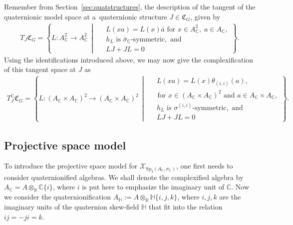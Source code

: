 \documentclass[oneside,11pt]{amsart}
\theoremstyle{definition}
\theoremstyle{remark}
\newcommand{\midwd}{\,\middle\vert\,}
\numberwithin{thm}{section}
\numberwithin{equation}{section}
\begin{document}
Remember from Section~\ref{sec:quatstructures}, the description of the tangent of the quaternionic model space at a~quaternionic structure $J\in\mathfrak{C}_G$,  given by 
\begin{align*}
T_J\mathfrak{C}_G=\left\{L\colon A_\mathbb{C}^2\to A_\mathbb{C}^2  \midwd
\begin{aligned} 
&\ L(xa)=L(x)\bar a \text{ for } x\in A_\mathbb{C}^2,\;a\in A_\mathbb{C}, \\
&\ h_L \text{ is }\bar\sigma_{\mathbb C}\text{-symmetric},\text{ and}\\
&\ LJ+JL=0
\end{aligned}
\right\}.
\end{align*}
Using the identifications introduced above, we may now give the complexification of this tangent space at $J$ as 
\begin{align}\label{eq:complex_tang_quater_str_model} 
T^\mathbb C_J\mathfrak{C}_G=\left\{L\colon (A_{\mathbb C}\times A_{\mathbb C})^2 \to (A_{\mathbb C}\times A_{\mathbb C})^2 \midwd 
\begin{aligned}  
&\ L(xa)=L(x)\theta_{(i,i)}(a),\\ &\text{ for } x\in (A_{\mathbb C}\times A_{\mathbb C})^2 \text{ and } a\in A_{\mathbb C}\times A_{\mathbb C},\\
&\ h_L \text{ is } \sigma^{(i,i)}\text{-symmetric}, \text{ and } \\
&\ LJ+JL=0
\end{aligned}
\right\}.
\end{align}


\subsection{Projective space model}\label{sec:projstructure_cpx} To introduce the projective space model for $\mathcal{X}_{\mathrm{Sp}_{2}(A_{\mathbb{C}},\sigma_{\mathbb{C}})}$, one first needs to consider quaternionified algebras. We shall denote the complexified algebra by $A_\mathbb{C}=A\otimes_\mathbb{R}\mathbb{C}\{i\}$, where $i$ is put here to emphasize the imaginary unit of $\mathbb{C}$. Now we consider the quaternionification $A_\mathbb{H}:=A\otimes_\mathbb{R}\mathbb{H}\{i,j,k\}$, where $i,j,k$ are the imaginary units of the quaternion skew-field $\mathbb{H}$ that fit into the relation $ij=-ji=k$. 
\end{document}
